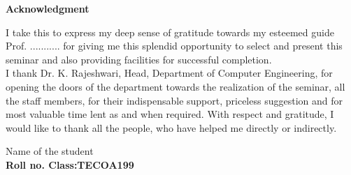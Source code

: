 \newpage
\begin{center}
{\large {\textbf{Acknowledgment}}}\\
\end{center}

I take this  to express my deep sense of gratitude towards my esteemed guide Prof. ........... for giving me this splendid opportunity to select and present this seminar and also providing facilities for successful completion. \\
I thank Dr. K. Rajeshwari, Head, Department of Computer Engineering, for opening the doors of the department towards the realization of the seminar, all the staff members, for their indispensable support, priceless suggestion and for most valuable time lent as and when required. With respect and gratitude, I would like to thank all the people, who have helped me directly or indirectly.       

\vspace{2in}

\begin{flushright}
Name of the student\\
\textbf{Roll no.    Class:TECOA199 }
\end{flushright}